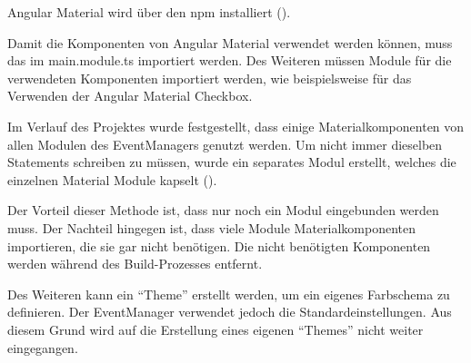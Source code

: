 

Angular Material wird über den \gls{npm} installiert ().


Damit die Komponenten von Angular Material verwendet werden können, muss das  im main.module.ts importiert werden. Des Weiteren müssen Module für die verwendeten Komponenten importiert werden, wie beispielsweise  für das Verwenden der Angular Material Checkbox.

Im Verlauf des Projektes wurde festgestellt, dass einige Materialkomponenten von allen Modulen des EventManagers genutzt werden. Um nicht immer dieselben  Statements schreiben zu müssen, wurde ein separates Modul erstellt, welches die einzelnen Material Module kapselt ().

Der Vorteil dieser Methode ist, dass nur noch ein Modul eingebunden werden muss. Der Nachteil hingegen ist, dass viele Module Materialkomponenten importieren, die sie gar nicht benötigen. Die nicht benötigten Komponenten werden während des Build-Prozesses entfernt.



Des Weiteren kann ein \enquote{Theme} erstellt werden, um ein eigenes Farbschema zu definieren. Der EventManager verwendet jedoch die Standardeinstellungen.
Aus diesem Grund wird auf die Erstellung eines eigenen \enquote{Themes} nicht weiter eingegangen.

